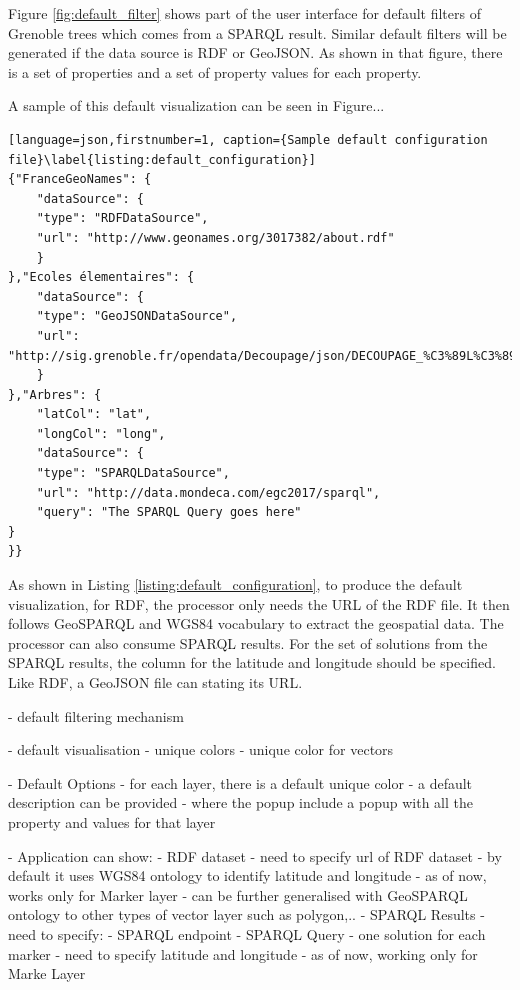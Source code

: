 \documentclass[a4paper,pagenum,english]{rnti}
\begin{document}
{Figure \ref{fig:default_filter} shows part of the user interface for default filters of Grenoble trees which comes from a SPARQL result. Similar default filters will be generated if the data source is RDF or GeoJSON. As shown in that figure, there is a set of properties and a set of property values for each property.  


A sample of this default visualization can be seen in Figure... 






  
  

\begin{lstlisting}[language=json,firstnumber=1, caption={Sample default configuration file}\label{listing:default_configuration}]
{"FranceGeoNames": {
	"dataSource": {
	"type": "RDFDataSource",
	"url": "http://www.geonames.org/3017382/about.rdf"
	}
},"Ecoles élementaires": {
	"dataSource": {
	"type": "GeoJSONDataSource",
	"url": "http://sig.grenoble.fr/opendata/Decoupage/json/DECOUPAGE_%C3%89L%C3%89MENTAIRES_EPSG4326.json"
	}
},"Arbres": {
	"latCol": "lat",
	"longCol": "long",
	"dataSource": {
	"type": "SPARQLDataSource",
	"url": "http://data.mondeca.com/egc2017/sparql",
	"query": "The SPARQL Query goes here"
}
}}
\end{lstlisting}
 
As shown in Listing \ref{listing:default_configuration}, to produce the default visualization, for RDF, the processor only needs the URL of the RDF file. It then follows GeoSPARQL and WGS84 vocabulary to extract the geospatial data. The processor can also consume SPARQL results. For the set of solutions from the SPARQL results, the column for the latitude and longitude should be specified. Like RDF, a GeoJSON file can stating its URL.



- default filtering mechanism

- default visualisation
	- unique colors
	- unique color for vectors


- Default Options
	- for each layer, there is a default unique color
	- a default description can be provided
		- where the popup include a popup with all the property and values for that layer
		



- Application can show:
	- RDF dataset
		- need to specify url of RDF dataset
		- by default it uses WGS84 ontology to identify latitude and longitude
		- as of now, works only for Marker layer
		- can be further generalised with GeoSPARQL ontology to other types of vector layer such as polygon,.. 
	- SPARQL Results
		- need to specify:
			- SPARQL endpoint
			- SPARQL Query
			- one solution for each marker
			- need to specify latitude and longitude
			- as of now, working only for Marke Layer

}
\end{document}
